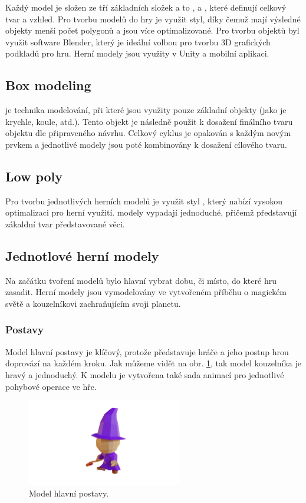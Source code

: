 Každý model je složen ze tří základních složek a to ,  a , které definují celkový tvar a vzhled. Pro tvorbu modelů do hry je využit \cite{LowPoly} styl, díky čemuž mají výsledné objekty menší počet polygonů a jsou více optimalizované. Pro tvorbu objektů byl využit software Blender, který je ideální volbou pro tvorbu 3D grafických podkladů pro hru. Herní modely jsou využity v Unity a mobilní aplikaci.

\subsection{Box modeling}
\cite{BoxModeling} je technika modelování, při které jsou využity pouze základní objekty (jako je krychle, koule, atd.). Tento objekt je následně použit k dosažení finálního tvaru objektu dle připraveného návrhu. Celkový cyklus je opakován s každým novým prvkem a jednotlivé modely jsou poté kombinovány k dosažení cílového tvaru.

\subsection{Low poly}
Pro tvorbu jednotlivých herních modelů je využit styl \cite{LowPoly}, který nabízí vysokou optimalizaci pro herní využití.  modely vypadají jednoduché, přičemž představují zákaldní tvar představované věci.

\subsection{Jednotlové herní modely}
Na začátku tvoření modelů bylo hlavní vybrat dobu, či místo, do které hru zasadit. Herní modely jsou vymodelovány ve vytvořeném příběhu o magickém světě a kouzelníkovi zachraňujícím svoji planetu.

\subsubsection{Postavy}
Model hlavní postavy je klíčový, protože představuje hráče a jeho postup hrou doprovází na každém kroku. Jak můžeme vidět na obr. \ref{fig:hlavni-postava}, tak model kouzelníka je hravý a jednoduchý. K modelu je vytvořena také sada animací pro jednotlivé pohybové operace ve hře.

\begin{figure}[h]
    \centering
    \includegraphics[width=0.6\textwidth]{img/hlavni-postava.png}
    \caption{Model hlavní postavy.}
    \label{fig:hlavni-postava}
\end{figure}

